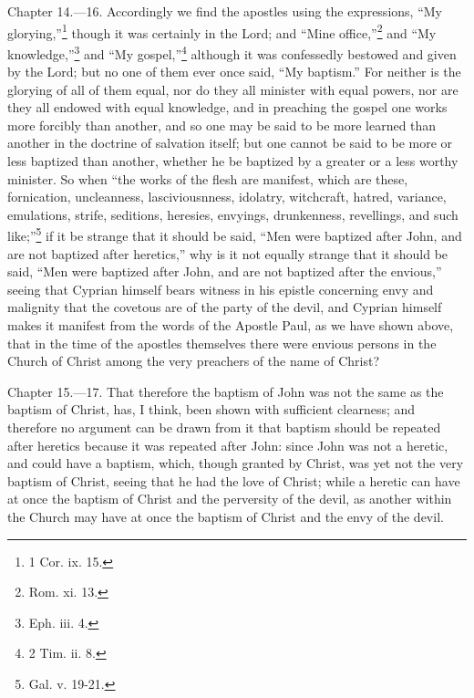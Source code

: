 
Chapter 14.—16. Accordingly we find the apostles using the expressions, ``My glorying,''\footnote{\par  1 Cor. ix. 15.} though it was certainly in the Lord; and ``Mine office,''\footnote{\par  Rom. xi. 13.} and ``My knowledge,''\footnote{\par  Eph. iii. 4.} and ``My gospel,''\footnote{\par  2 Tim. ii. 8.} although it was confessedly bestowed and given by the Lord; but no one of them ever once said, ``My baptism.'' For neither is the glorying of all of them equal, nor do they all minister with equal powers, nor are they all endowed with equal knowledge, and in preaching the gospel one works more forcibly than another, and so one may be said to be more learned than another in the doctrine of salvation itself; but one cannot be said to be more or less baptized than another, whether he be baptized by a greater or a less worthy minister. So when ``the works of the flesh are manifest, which are these, fornication, uncleanness, lasciviousnness, idolatry, witchcraft, hatred, variance, emulations, strife, seditions, heresies, envyings, drunkenness, revellings, and such like;''\footnote{\par  Gal. v. 19-21.} if it be strange that it should be said, ``Men were baptized after John, and are not baptized after heretics,'' why is it not equally strange that it should be said, ``Men were baptized after John, and are not baptized after the envious,'' seeing that Cyprian himself bears witness in his epistle concerning envy and malignity that the covetous are of the party of the devil, and Cyprian himself makes it manifest from the words of the Apostle Paul, as we have shown above, that in the time of the apostles themselves there were envious persons in the Church of Christ among the very preachers of the name of Christ?


Chapter 15.—17. That therefore the baptism of John was not the same as the baptism of Christ, has, I think, been shown with sufficient clearness; and therefore no argument can be drawn from it that baptism should be repeated after heretics because it was repeated after John: since John was not a heretic, and could have a baptism, which, though granted by Christ, was yet not the very baptism of Christ, seeing that he had the love of Christ; while a heretic can have at once the baptism of Christ and the perversity of the devil, as another within the Church may have at once the baptism of Christ and the envy of the devil.

